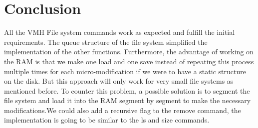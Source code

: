 \chapter{Conclusion}
\label{cp:conclusion}

All the VMH File system commands work as expected and fulfill the initial requirements. The queue structure of the file system simplified the implementation of the other functions. Furthermore, the advantage of working on the RAM is that we make one load and one save instead of repeating this process multiple times for each micro-modification if we were to have a static structure on the disk.
But this approach will only work for very small file systems as mentioned before. To counter this problem, a possible solution is to segment the file system and load it into the RAM segment by segment to make the necessary modifications.We could also add a recursive flag to the remove command, the implementation is going to be similar to the ls and size commands.